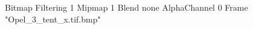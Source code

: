 {Bitmap
	{Filtering 1}
	{Mipmap 1}
	{Blend none}
	{AlphaChannel 0}
	{Frame "Opel_3_tent_x.tif.bmp"}
}
